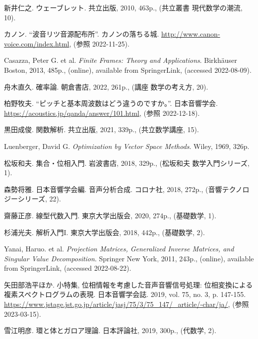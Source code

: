 \documentclass[../../main]{subfiles}
\begin{document}
{}
\begin{thebibliography}{99}
    新井仁之. ウェーブレット. 共立出版, 2010, 463p., (共立叢書 現代数学の潮流, 10).

    カノン. “波音リツ音源配布所”. カノンの落ちる城. \url{http://www.canon-voice.com/index.html}, (参照 2022-11-25).

    Casazza, Peter G. et al. \textit{Finite Frames: Theory and Applications}. Birkhäuser Boston, 2013, 485p., (online), available from SpringerLink, (accessed 2022-08-09).

    舟木直久. 確率論. 朝倉書店, 2022, 261p., (講座 数学の考え方, 20).

    柏野牧夫. “ピッチと基本周波数はどう違うのですか。”. 日本音響学会. \url{https://acoustics.jp/qanda/answer/101.html}, (参照 2022-12-18).

    黒田成俊. 関数解析. 共立出版, 2021, 339p., (共立数学講座, 15).

    Luenberger, David G. \textit{Optimization by Vector Space Methods}. Wiley, 1969, 326p.

    松坂和夫. 集合・位相入門. 岩波書店, 2018, 329p., (松坂和夫 数学入門シリーズ, 1).

    森勢将雅. 日本音響学会編. 音声分析合成. コロナ社, 2018, 272p., (音響テクノロジーシリーズ, 22).

    齋藤正彦. 線型代数入門. 東京大学出版会, 2020, 274p., (基礎数学, 1).

    杉浦光夫. 解析入門I. 東京大学出版会, 2018, 442p., (基礎数学, 2).

    Yanai, Haruo. et al. \textit{Projection Matrices, Generalized Inverse Matrices, and Singular Value Decomposition}. Springer New York, 2011, 243p., (online), available from SpringerLink, (accessed 2022-08-22).

    矢田部浩平ほか. 小特集, 位相情報を考慮した音声音響信号処理: 位相変換による複素スペクトログラムの表現. 日本音響学会誌. 2019, vol. 75, no. 3, p. 147-155. \url{https://www.jstage.jst.go.jp/article/jasj/75/3/75_147/_article/-char/ja/}, (参照 2023-03-15).

    雪江明彦. 環と体とガロア理論. 日本評論社, 2019, 300p., (代数学, 2).
\end{thebibliography}
\end{document}
